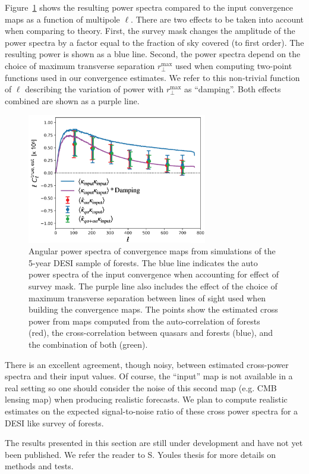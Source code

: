 Figure~\ref{fig:forest_lensing_power_spectra} shows the resulting power spectra
compared to the input convergence maps as a function of multipole $\ell$. 
There are two effects to be taken into account when comparing to theory. 
First, the survey mask changes the amplitude of the power spectra by a factor equal 
to the fraction of sky covered (to first order). The resulting power is shown as a blue line. 
Second, the power spectra depend on the choice of maximum transverse separation $r_\perp^\mathrm{max}$ 
used when computing two-point functions used in our convergence estimates. 
We refer to this non-trivial function of $\ell$ describing 
the variation of power with $r_\perp^\mathrm{max}$
as ``damping''. Both effects combined are shown as a purple line.


\begin{figure}
    \centering
    \includegraphics[width=0.7\textwidth]{fig/forests/forest_lensing_power_spectra.png}
    \caption{Angular power spectra of convergence maps from simulations of the 5-year DESI sample of \lya forests. 
    The blue line indicates the auto power spectra of the input convergence when 
    accounting for effect of survey mask. The purple line also includes the effect of 
    the choice of maximum transverse separation between lines of sight used when 
    building the convergence maps. The points show the estimated cross power 
    from maps computed from the auto-correlation of forests (red), the cross-correlation 
    between quasars and forests (blue), and the combination of both (green). 
    }
    \label{fig:forest_lensing_power_spectra}
\end{figure}

There is an excellent agreement, though noisy, between estimated cross-power spectra  
and their input values. Of course, the ``input'' map is not available in a real setting 
so one should consider the noise of this second map (e.g. CMB lensing map) when producing
realistic forecasts. We plan to compute realistic estimates on the expected signal-to-noise ratio 
of these cross power spectra for a DESI like survey of forests. 

The results presented in this section are still under development and have not yet  
been published. We refer the reader to S. Youles thesis for more details on methods 
and tests. 



